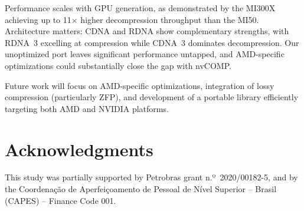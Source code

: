 \documentclass[runningheads]{llncs}
\begin{document}
Performance scales with GPU generation, as demonstrated by the MI300X achieving up to 11$\times$ higher decompression throughput than the MI50. Architecture matters: CDNA and RDNA show complementary strengths, with RDNA~3 excelling at compression while CDNA~3 dominates decompression. Our unoptimized port leaves significant performance untapped, and AMD-specific optimizations could substantially close the gap with nvCOMP.

Future work will focus on AMD-specific optimizations, integration of lossy compression (particularly ZFP), and development of a portable library efficiently targeting both AMD and NVIDIA platforms.


\section*{Acknowledgments}

This study was partially supported by Petrobras grant n.º~2020/00182-5, and by the Coordenação de Aperfeiçoamento de Pessoal de Nível Superior – Brasil (CAPES) – Finance Code 001.




\end{document}
